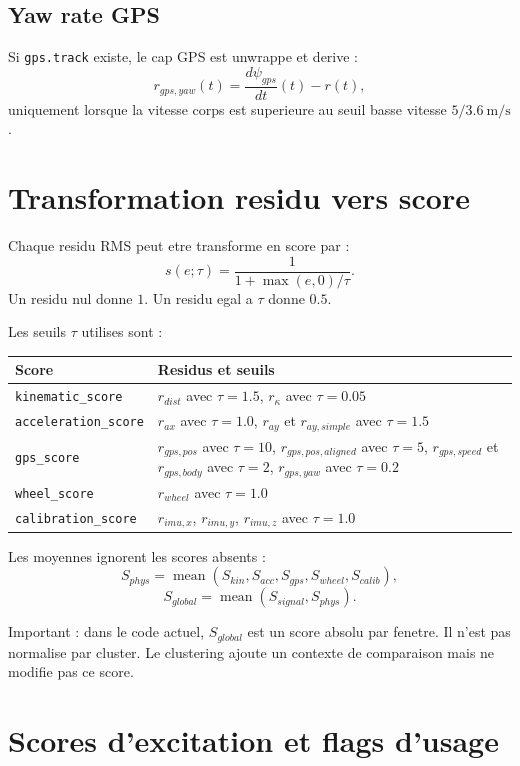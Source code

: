 \documentclass[11pt,a4paper]{article}
\begin{document}
\subsection{Yaw rate GPS}

Si \texttt{gps.track} existe, le cap GPS est unwrappe et derive :
\[
  r_{gps,yaw}(t)=\frac{d\psi_{gps}}{dt}(t)-r(t),
\]
uniquement lorsque la vitesse corps est superieure au seuil basse vitesse $5/3.6~\mathrm{m/s}$.

\section{Transformation residu vers score}

Chaque residu RMS peut etre transforme en score par :
\[
  s(e;\tau)=\frac{1}{1+\max(e,0)/\tau}.
\]
Un residu nul donne $1$. Un residu egal a $\tau$ donne $0.5$.

Les seuils $\tau$ utilises sont :

\begin{longtable}{ll}
\toprule
Score & Residus et seuils \\
\midrule
\texttt{kinematic\_score} &
$r_{dist}$ avec $\tau=1.5$, $r_{\kappa}$ avec $\tau=0.05$ \\
\texttt{acceleration\_score} &
$r_{ax}$ avec $\tau=1.0$, $r_{ay}$ et $r_{ay,simple}$ avec $\tau=1.5$ \\
\texttt{gps\_score} &
$r_{gps,pos}$ avec $\tau=10$, $r_{gps,pos,aligned}$ avec $\tau=5$,
$r_{gps,speed}$ et $r_{gps,body}$ avec $\tau=2$, $r_{gps,yaw}$ avec $\tau=0.2$ \\
\texttt{wheel\_score} &
$r_{wheel}$ avec $\tau=1.0$ \\
\texttt{calibration\_score} &
$r_{imu,x}$, $r_{imu,y}$, $r_{imu,z}$ avec $\tau=1.0$ \\
\bottomrule
\end{longtable}

Les moyennes ignorent les scores absents :
\[
  S_{phys}=\operatorname{mean}(S_{kin},S_{acc},S_{gps},S_{wheel},S_{calib}),
\]
\[
  S_{global}=\operatorname{mean}(S_{signal},S_{phys}).
\]

Important : dans le code actuel, $S_{global}$ est un score absolu par fenetre. Il n'est pas normalise par cluster. Le clustering ajoute un contexte de comparaison mais ne modifie pas ce score.

\section{Scores d'excitation et flags d'usage}
\end{document}
